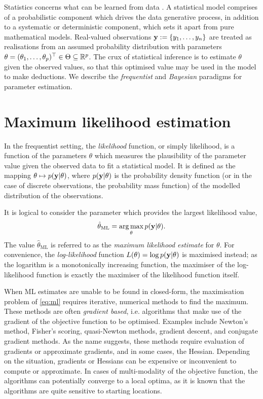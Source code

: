 Statistics concerns what can be learned from data \citep{davison2003statistical}.
A statistical model comprises of a probabilistic component which drives the data generative process, in addition to a systematic or deterministic component, which sets it apart from pure mathematical models.
Real-valued observations ${\mathbf y} := \{y_1,\dots,y_n\}$ are treated as realisations from an assumed probability distribution with parameters $\theta = (\theta_1,\dots,\theta_p)^\top \in \Theta \subseteq \mathbb{R}^p$.
The crux of statistical inference is to estimate $\theta$ given the observed values, so that this optimised value may be used in the model to make deductions.
We describe the \emph{frequentist} and \emph{Bayesian} paradigms for parameter estimation.

\section{Maximum likelihood estimation}

In the frequentist setting, the \emph{likelihood} function, or simply likelihood, is a function of the parameters $\theta$ which measures the plausibility of the parameter value given the observed data to fit a statistical model.
It is defined as the mapping $\theta \mapsto p({\mathbf y}|\theta)$, where $p({\mathbf y}|\theta)$ is the probability density function (or in the case of discrete observations, the probability mass function) of the modelled distribution of the observations.
 
It is logical to consider the parameter which provides the largest likelihood value,
\begin{equation}\label{eq:ml}
  \hat\theta_{\text{ML}} = \operatorname*{arg\,max}_\theta p({\mathbf y}|\theta).
\end{equation}
The value $\hat\theta_{\text{ML}}$ is referred to as the \emph{maximum likelihood estimate} for $\theta$.
For convenience, the \emph{log-likelihood} function $L(\theta) = \log p({\mathbf y}|\theta)$ is maximised instead; as the logarithm is a monotonically increasing function, the maximiser of the log-likelihood function is exactly the maximiser of the likelihood function itself.

When ML estimates are unable to be found in closed-form, the maximisation problem of \cref{eq:ml} requires iterative, numerical methods to find the maximum.
These methods are often \emph{gradient based}, i.e. algorithms that make use of the gradient of the objective function to be optimised.
Examples include Newton's method, Fisher's scoring, quasi-Newton methods, gradient descent, and conjugate gradient methods.
As the name suggests, these methods require evaluation of gradients or approximate gradients, and in some cases, the Hessian.
Depending on the situation, gradients or Hessians can be expensive or inconvenient to compute or approximate.
In cases of multi-modality of the objective function, the algorithms can potentially converge to a local optima, as it is known that the algorithms are quite sensitive to starting locations.

